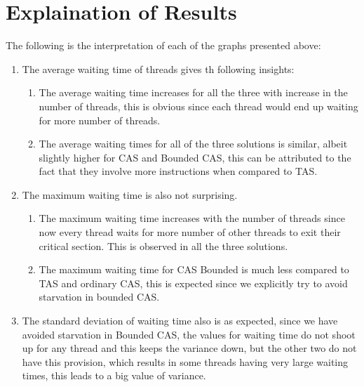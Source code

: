 \documentclass[a4paper,12pt]{report}
\begin{document}
\section{Explaination of Results}
The following is the interpretation of each of the graphs presented above:
\begin{enumerate}
\item The average waiting time of threads gives th following insights:
\begin{enumerate}
\item The average waiting time increases for all the three with increase in the number of threads, this is obvious since each thread would end up waiting for more number of threads.
\item The average waiting times for all of the three solutions is similar, albeit slightly higher for CAS and Bounded CAS, this can be attributed to the fact that they involve more instructions when compared to TAS.
\end{enumerate}
\item The maximum waiting time is also not surprising.
\begin{enumerate}
\item The maximum waiting time increases with the number of threads since now every thread waits for more number of other threads to exit their critical section. This is observed in all the three solutions.
\item The maximum waiting time for CAS Bounded is much less compared to TAS and ordinary CAS, this is expected since we explicitly try to avoid starvation in bounded CAS.
\end{enumerate}
\item The standard deviation of waiting time also is as expected, since we have avoided starvation in Bounded CAS, the values for waiting time do not shoot up for any thread and this keeps the variance down, but the other two do not have this provision, which results in some threads having very large waiting times, this leads to a big value of variance.
\end{enumerate}
\end{document}
